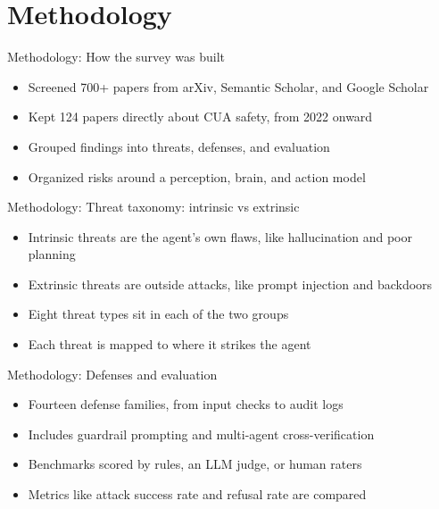 \documentclass[10pt]{beamer}
\begin{document}
\section{Methodology}
\begin{frame}[allowframebreaks]{Methodology: How the survey was built}
\begin{itemize}
  \item Screened 700+ papers from arXiv, Semantic Scholar, and Google Scholar
  \item Kept 124 papers directly about CUA safety, from 2022 onward
  \item Grouped findings into threats, defenses, and evaluation
  \item Organized risks around a perception, brain, and action model
\end{itemize}
\end{frame}
\begin{frame}[allowframebreaks]{Methodology: Threat taxonomy: intrinsic vs extrinsic}
\begin{itemize}
  \item Intrinsic threats are the agent's own flaws, like hallucination and poor planning
  \item Extrinsic threats are outside attacks, like prompt injection and backdoors
  \item Eight threat types sit in each of the two groups
  \item Each threat is mapped to where it strikes the agent
\end{itemize}
\end{frame}
\begin{frame}[allowframebreaks]{Methodology: Defenses and evaluation}
\begin{itemize}
  \item Fourteen defense families, from input checks to audit logs
  \item Includes guardrail prompting and multi-agent cross-verification
  \item Benchmarks scored by rules, an LLM judge, or human raters
  \item Metrics like attack success rate and refusal rate are compared
\end{itemize}
\end{frame}
\end{document}
